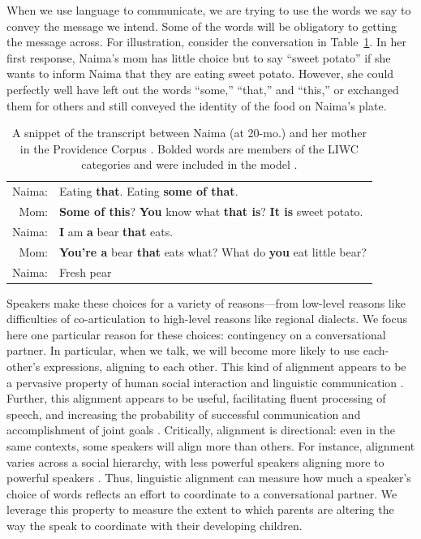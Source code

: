 \documentclass[10pt,letterpaper]{article}
\begin{document}
When we use language to communicate, we are trying to use the words we say to convey the message we intend. Some of the words will be obligatory to getting the message across. For illustration, consider the conversation in Table~\ref{tab:naima}. In her first response, Naima's mom has little choice but to say ``sweet potato'' if she wants to inform Naima that they are eating sweet potato. However, she could perfectly well have left out the words ``some,'' ``that,'' and ``this,'' or exchanged them for others and still conveyed the identity of the food on Naima's plate.  

\begin{table}[tb]
\begin{tabular}{r p{}}
\hline
Naima: & Eating \textbf{that}. Eating \textbf{some of that}.\\

Mom: & \textbf{Some of this}? \textbf{You} know what \textbf{that is}? \textbf{It is} sweet potato.\\

Naima: & \textbf{I} am \textbf{a} bear \textbf{that} eats.\\

Mom: & \textbf{You're a} bear \textbf{that} eats what? What do \textbf{you} eat little bear?\\

Naima: & Fresh pear\\
\hline
\end{tabular}
\caption{\label{tab:naima}A snippet of the transcript between Naima (at 20-mo.) and her mother in the Providence Corpus \cite{demuth2006}. Bolded words are members of the LIWC categories and were included in the model \cite{pennebaker2007}. }
\end{table}

Speakers make these choices for a variety of reasons---from low-level reasons like difficulties of co-articulation to high-level reasons like regional dialects. We focus here one particular reason for these choices: contingency on a conversational partner. In particular, when we talk, we will become more likely to use each-other's expressions, aligning to each other. This kind of alignment appears to be a pervasive property of human social interaction and linguistic communication \cite{giles1991, garrod2004}.  Further, this alignment appears to be useful, facilitating fluent processing of speech, and increasing the probability of successful communication and accomplishment of joint goals \cite{ireland2011, fusaroli2012}. Critically, alignment is directional: even in the same contexts, some speakers will align more than others. For instance, alignment varies across a social hierarchy, with less powerful speakers aligning more to powerful speakers \cite{kacewicz2013}. Thus, linguistic alignment can measure how much a speaker's choice of words reflects an effort to coordinate to a conversational partner. We leverage this property to measure the extent to which parents are altering the way the speak to coordinate with their developing children.
\end{document}
